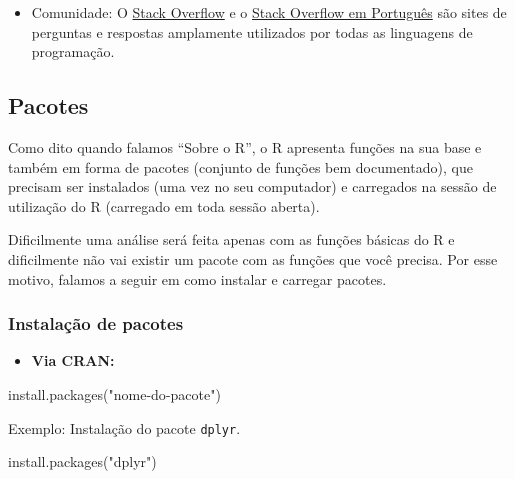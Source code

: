 \documentclass[
  letterpaper,
  DIV=11,
  numbers=noendperiod]{scrreprt}
\newenvironment{Shaded}{\begin{snugshade}}{\end{snugshade}}
\newcommand{\FunctionTok}[1]{\textcolor[rgb]{0.28,0.35,0.67}{#1}}
\newcommand{\NormalTok}[1]{\textcolor[rgb]{0.00,0.23,0.31}{#1}}
\newcommand{\StringTok}[1]{\textcolor[rgb]{0.13,0.47,0.30}{#1}}
\providecommand{\tightlist}{%
  \setlength{\itemsep}{0pt}\setlength{\parskip}{0pt}}\usepackage{longtable,booktabs,array}
\begin{document}
\begin{itemize}
\tightlist
\item
  Comunidade: O \href{https://stackoverflow.com/}{Stack Overflow} e o
  \href{https://pt.stackoverflow.com/}{Stack Overflow em Português} são
  sites de perguntas e respostas amplamente utilizados por todas as
  linguagens de programação.
\end{itemize}

\hypertarget{pacotes}{%
\subsection{Pacotes}\label{pacotes}}

Como dito quando falamos ``Sobre o R'', o R apresenta funções na sua
base e também em forma de pacotes (conjunto de funções bem documentado),
que precisam ser instalados (uma vez no seu computador) e carregados na
sessão de utilização do R (carregado em toda sessão aberta).

Dificilmente uma análise será feita apenas com as funções básicas do R e
dificilmente não vai existir um pacote com as funções que você precisa.
Por esse motivo, falamos a seguir em como instalar e carregar pacotes.

\hypertarget{instalauxe7uxe3o-de-pacotes}{%
\subsubsection{Instalação de
pacotes}\label{instalauxe7uxe3o-de-pacotes}}

\begin{itemize}
\tightlist
\item
  \textbf{Via CRAN:}
\end{itemize}

\begin{Shaded}
\begin{Highlighting}[]
\FunctionTok{install.packages}\NormalTok{(}\StringTok{"nome{-}do{-}pacote"}\NormalTok{)}
\end{Highlighting}
\end{Shaded}

Exemplo: Instalação do pacote \texttt{dplyr}.

\begin{Shaded}
\begin{Highlighting}[]
\FunctionTok{install.packages}\NormalTok{(}\StringTok{"dplyr"}\NormalTok{)}
\end{Highlighting}
\end{Shaded}
\end{document}
